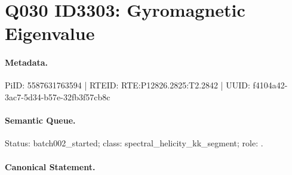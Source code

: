 \section*{Q030 ID3303: Gyromagnetic Eigenvalue}
\paragraph{Metadata.}
PiID: 5587631763594 | RTEID: RTE:P12826.2825:T2.2842 | UUID: f4104a42-3ac7-5d34-b57e-32fb3f57cb8c

\paragraph{Semantic Queue.}
Status: batch002\_started; class: spectral\_helicity\_kk\_segment; role: .

\paragraph{Canonical Statement.}
